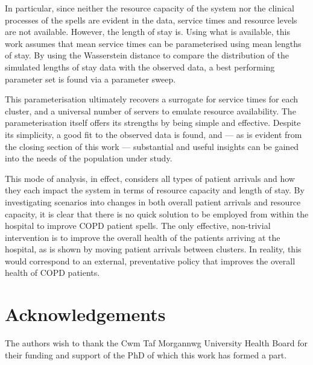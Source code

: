 \documentclass[11pt]{article}
\begin{document}
In particular, since neither the resource capacity of the system nor the
clinical processes of the spells are evident in the data, service times and
resource levels are not available. However, the length of stay is. Using what is
available, this work assumes that mean service times can be parameterised using
mean lengths of stay. By using the Wasserstein distance to compare the
distribution of the simulated lengths of stay data with the observed data, a
best performing parameter set is found via a parameter sweep. 

This parameterisation ultimately recovers a surrogate for service times for each
cluster, and a universal number of servers to emulate resource availability. The
parameterisation itself offers its strengths by being simple and effective.
Despite its simplicity, a good fit to the observed data is found, and --- as is
evident from the closing section of this work --- substantial and useful
insights can be gained into the needs of the population under study. 

This mode of analysis, in effect, considers all types of patient arrivals and
how they each impact the system in terms of resource capacity and length of
stay. By investigating scenarios into changes in both overall patient arrivals
and resource capacity, it is clear that there is no quick solution to be
employed from within the hospital to improve COPD patient spells. The only
effective, non-trivial intervention is to improve the overall health of the
patients arriving at the hospital, as is shown by moving patient arrivals
between clusters. In reality, this would correspond to an external, preventative
policy that improves the overall health of COPD patients. 

\section*{Acknowledgements}

The authors wish to thank the Cwm Taf Morgannwg University Health Board for
their funding and support of the PhD of which this work has formed a part.
\end{document}
